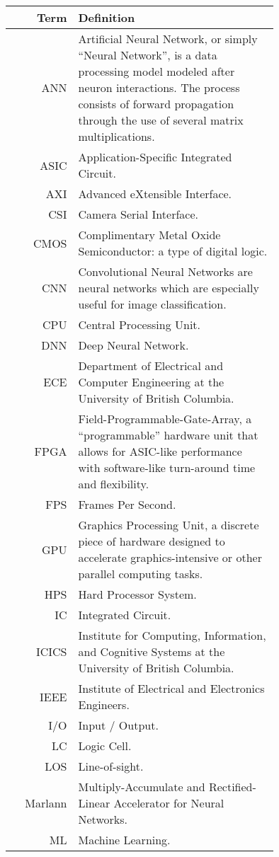 \thispagestyle{empty}

\begin{tabular}[h]{rp{0.75\linewidth}}
    \hline
    \textbf{Term} & \textbf{Definition}\\
    \hline

    ANN & Artificial Neural Network, or simply ``Neural Network'', is a data processing model modeled after neuron interactions. The process consists of forward propagation through the use of several matrix multiplications.\cite{ann}\\
    ASIC & Application-Specific Integrated Circuit.\\
    AXI & Advanced eXtensible Interface. \\
    CSI & Camera Serial Interface. \\
    CMOS & Complimentary Metal Oxide Semiconductor: a type of digital logic. \\
    CNN & Convolutional Neural Networks are neural networks which are especially useful for image classification.\cite{cnn} \\
    CPU & Central Processing Unit. \\
    DNN & Deep Neural Network. \\
    ECE & Department of Electrical and Computer Engineering at the University of British Columbia.\\
    FPGA & Field-Programmable-Gate-Array, a ``programmable'' hardware unit that allows for ASIC-like performance with software-like turn-around time and flexibility.\\
    FPS & Frames Per Second.\\
    GPU & Graphics Processing Unit, a discrete piece of hardware designed to accelerate graphics-intensive or other parallel computing tasks.\\
    HPS & Hard Processor System. \\
    IC & Integrated Circuit. \\
	ICICS & Institute for Computing, Information, and Cognitive Systems at the University of British Columbia.\\
    IEEE & Institute of Electrical and Electronics Engineers. \\
    I/O & Input / Output. \\
    LC & Logic Cell. \\
    LOS & Line-of-sight.\\
    Marlann & Multiply-Accumulate and Rectified-Linear Accelerator for Neural Networks. \\
    ML & Machine Learning.\\

\end{tabular}
